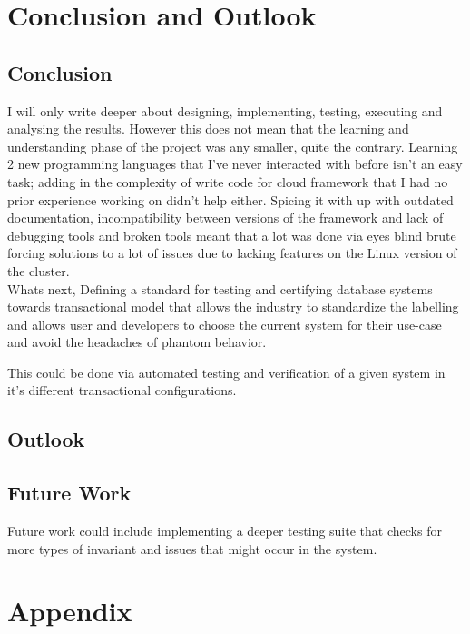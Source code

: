 \documentclass[a4paper,10pt,titlepage]{report}
\begin{document}
    \chapter{Conclusion and Outlook}
    \section*{Conclusion}
    
     I will only write deeper about designing, implementing, testing, executing and analysing the results. However this does not mean that the learning and understanding phase of the project was any smaller, quite the contrary. Learning 2 new programming languages that I've never interacted with before isn't an easy task; adding in the complexity of write code for cloud framework that I had no prior experience working on didn't help either. Spicing it with up with outdated documentation, incompatibility between versions of the framework and lack of debugging tools and broken tools meant that a lot was done via eyes blind brute forcing solutions to a lot of issues due to lacking features on the Linux version of the cluster.\\
     
     
    Whats next, Defining a standard for testing and certifying database systems towards transactional model that allows the industry to standardize the labelling and allows user and developers to choose the current system for their use-case and avoid the headaches of phantom behavior.

    This could be done via automated testing and verification of a given system in it's different transactional configurations.

    \section*{Outlook}


    \section{Future Work}
    Future work could include implementing a deeper testing suite that checks for more types of invariant and issues that might occur in the system.





    \newpage


    \chapter{Appendix}
\end{document}
